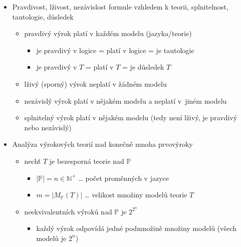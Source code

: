 \begin{itemize}
\begin{itemize}
\item model (jazyka) ve výrokové logice je pravdivostní ohodnocení proměnných
\begin{itemize}
\item model $v$ je modelem teorie $T$, pokud každý axiom z $T$ v modelu $v$ platí, píšeme $v\models T$
\end{itemize}
\item v predikátové logice: model jazyka $L$ nebo také $L$-struktura je libovolná struktura v signatuře jazyka $L$
\begin{itemize}
\item model teorie $T$ je $L$-struktura, ve které platí všechny axiomy teorie $T$
\end{itemize}
\end{itemize}
\item Pravdivost, lživost, nezávislost formule vzhledem k teorii, splnitelnost, tautologie, důsledek
\begin{itemize}
\item pravdivý výrok platí v každém modelu (jazyka/teorie)
\begin{itemize}
\item je pravdivý v logice = platí v logice = je tautologie
\item je pravdivý v $T$ = platí v $T$ = je důsledek $T$
\end{itemize}
\item lživý (sporný) výrok neplatí v žádném modelu
\item nezávislý výrok platí v nějakém modelu a neplatí v~jiném modelu
\item splnitelný výrok platí v nějakém modelu (tedy není lživý, je pravdivý nebo nezávislý)
\end{itemize}
\item Analýza výrokových teorií nad konečně mnoha prvovýroky
\begin{itemize}
\item nechť $T$ je bezesporná teorie nad $\mathbb P$
\begin{itemize}
\item $|\mathbb P|=n\in\mathbb N^+$ \dots{} počet proměnných v jazyce
\item $m=|M_{\mathbb P}(T)|$ \dots{} velikost množiny modelů teorie $T$
\end{itemize}
\item neekvivalentních výroků nad $\mathbb P$ je $2^{2^n}$
\begin{itemize}
\item každý výrok odpovídá jedné podmnožině množiny modelů (všech modelů je $2^n$)

\end{itemize}
\end{itemize}
\end{itemize}
